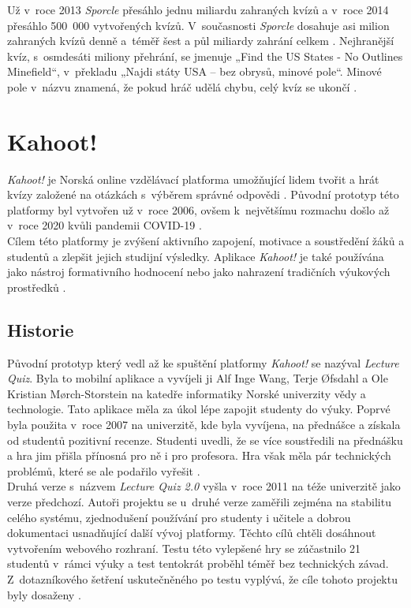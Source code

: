 \documentclass[12pt]{report}
\begin{document}
   Už v~roce 2013 \textit{Sporcle} přesáhlo jednu miliardu zahraných kvízů a v~roce 2014 přesáhlo 500~000 vytvořených kvízů. V~současnosti \textit{Sporcle} dosahuje asi milion zahraných kvízů denně a~téměř šest a půl miliardy zahrání celkem \cite{Sporcle2025a}. Nejhranější kvíz, s~osmdesáti miliony přehrání, se jmenuje „Find the US States - No Outlines Minefield“,\cite{Sporcle2026} v~překladu „Najdi státy USA – bez obrysů, minové pole“. Minové pole v~názvu znamená, že pokud hráč udělá chybu, celý kvíz se ukončí \cite{Sporcle2026a}.

\section{Kahoot!}
\textit{Kahoot!} je Norská online vzdělávací platforma umožňující lidem tvořit a hrát kvízy založené na otázkách s~výběrem správné odpovědi \cite{Kahoot2025}. Původní prototyp této platformy byl vytvořen už v~roce 2006, ovšem k~největšímu rozmachu došlo až v~roce 2020 kvůli pandemii COVID-19 \cite{wang2007lecture}\cite{Hanoa2020}.\\

Cílem této platformy je zvýšení aktivního zapojení, motivace a soustředění žáků a studentů a zlepšit jejich studijní výsledky. Aplikace\textit{ Kahoot!} je také používána jako nástroj formativního hodnocení nebo jako nahrazení tradičních výukových prostředků \cite{Wang2020}.

\subsection{Historie}
Původní prototyp který vedl až ke spuštění platformy \textit{Kahoot!} se nazýval \textit{Lecture Quiz}. Byla to mobilní aplikace a vyvíjeli ji Alf Inge Wang, Terje Øfsdahl a Ole Kristian Mørch-Storstein na katedře informatiky Norské univerzity vědy a technologie. Tato aplikace měla za úkol lépe zapojit studenty do výuky. Poprvé byla použita v~roce 2007 na univerzitě, kde byla vyvíjena, na přednášce a získala od studentů pozitivní recenze. Studenti uvedli, že se více soustředili na přednášku a hra jim přišla přínosná pro ně i pro profesora. Hra však měla pár technických problémů, které se ale podařilo vyřešit \cite{wang2007lecture}. \\

Druhá verze s~názvem\textit{ Lecture Quiz 2.0} vyšla v~roce 2011 na téže univerzitě jako verze předchozí. Autoři projektu se u~druhé verze zaměřili zejména na stabilitu celého systému, zjednodušení používání pro studenty i učitele a dobrou dokumentaci usnadňující další vývoj platformy. Těchto cílů chtěli dosáhnout vytvořením webového rozhraní. Testu této vylepšené hry se zúčastnilo 21 studentů v~rámci výuky a test tentokrát proběhl téměř bez technických závad. Z~dotazníkového šetření uskutečněného po testu vyplývá, že cíle tohoto projektu byly dosaženy \cite{Wu2011}.\\
\end{document}
